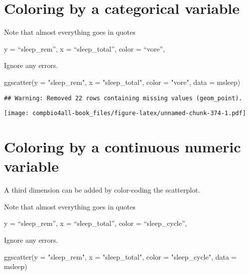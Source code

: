 \documentclass[
]{book}
\newenvironment{Shaded}{\begin{snugshade}}{\end{snugshade}}
\newcommand{\AttributeTok}[1]{\textcolor[rgb]{0.77,0.63,0.00}{#1}}
\newcommand{\FunctionTok}[1]{\textcolor[rgb]{0.00,0.00,0.00}{#1}}
\newcommand{\NormalTok}[1]{#1}
\newcommand{\StringTok}[1]{\textcolor[rgb]{0.31,0.60,0.02}{#1}}
\begin{document}
\hypertarget{coloring-by-a-categorical-variable-1}{%
\section{Coloring by a categorical variable}\label{coloring-by-a-categorical-variable-1}}

Note that almost everything goes in quotes

y = ``sleep\_rem'',
x = ``sleep\_total'',
color = ``vore'',

Ignore any errors.

\begin{Shaded}
\begin{Highlighting}[]
\FunctionTok{ggscatter}\NormalTok{(}\AttributeTok{y =} \StringTok{"sleep\_rem"}\NormalTok{,}
          \AttributeTok{x =} \StringTok{"sleep\_total"}\NormalTok{,}
          \AttributeTok{color =} \StringTok{"vore"}\NormalTok{,}
          \AttributeTok{data =}\NormalTok{ msleep)}
\end{Highlighting}
\end{Shaded}

\begin{verbatim}
## Warning: Removed 22 rows containing missing values (geom_point).
\end{verbatim}

\texttt{[image: compbio4all-book\_files/figure-latex/unnamed-chunk-374-1.pdf]}

\hypertarget{coloring-by-a-continuous-numeric-variable-1}{%
\section{Coloring by a continuous numeric variable}\label{coloring-by-a-continuous-numeric-variable-1}}

A third dimension can be added by color-coding the scatterplot.

Note that almost everything goes in quotes

y = ``sleep\_rem'',
x = ``sleep\_total'',
color = ``sleep\_cycle'',

Ignore any errors.

\begin{Shaded}
\begin{Highlighting}[]
\FunctionTok{ggscatter}\NormalTok{(}\AttributeTok{y =} \StringTok{"sleep\_rem"}\NormalTok{,}
          \AttributeTok{x =} \StringTok{"sleep\_total"}\NormalTok{,}
          \AttributeTok{color =} \StringTok{"sleep\_cycle"}\NormalTok{,}
          \AttributeTok{data =}\NormalTok{ msleep)}
\end{Highlighting}
\end{Shaded}
\end{document}
